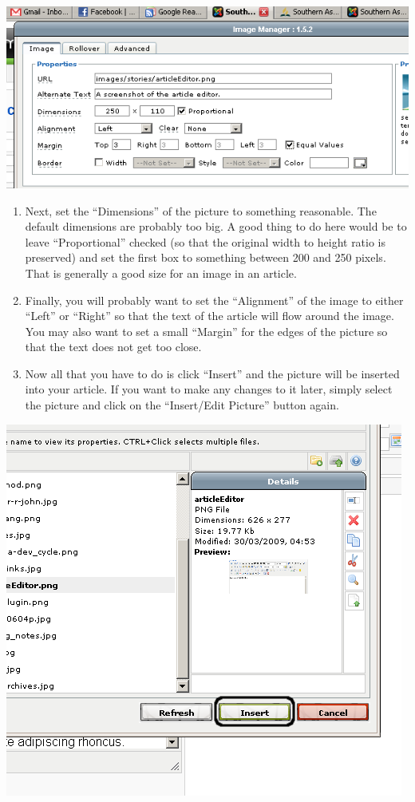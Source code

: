 \documentclass[letterpaper,10pt,english]{manual}
\begin{document}
{\hfill\includegraphics{articleInsertPictureSetProperties1.png}\hfill}
\begin{enumerate}
\item {} 
Next, set the “Dimensions” of the picture to something reasonable.  The default dimensions are probably too big.  A good thing to do here would be to leave “Proportional” checked (so that the original width to height ratio is preserved) and set the first box to something between 200 and 250 pixels.  That is generally a good size for an image in an article.

\item {} 
Finally, you will probably want to set the “Alignment” of the image to either “Left” or “Right” so that the text of the article will flow around the image.  You may also want to set a small “Margin” for the edges of the picture so that the text does not get too close.

\item {} 
Now all that you have to do is click “Insert” and the picture will be inserted into your article.  If you want to make any changes to it later, simply select the picture and click on the “Insert/Edit Picture” button again.

\end{enumerate}

{\hfill\includegraphics{articleInsertPictureInsertButton1.png}\hfill}
\end{document}
